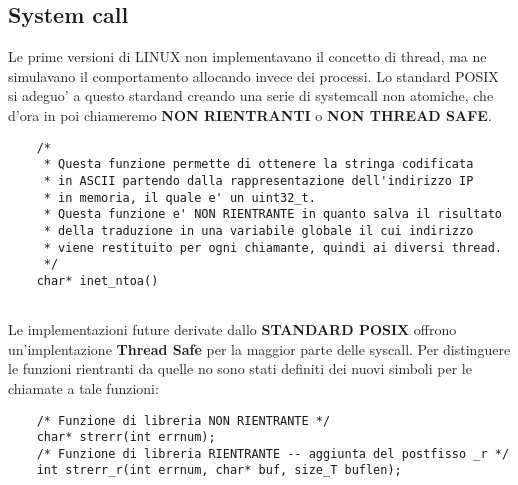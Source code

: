 \documentclass{article}
\begin{document}
    \subsection{System call}
    Le prime versioni di LINUX non implementavano il concetto
    di thread, ma ne simulavano il comportamento allocando 
    invece dei processi.
    Lo standard POSIX si adeguo' a questo stardand creando
    una serie di systemcall non atomiche, che d'ora in poi chiameremo
    \textbf{NON RIENTRANTI} o \textbf{NON THREAD SAFE}.
    \begin{verbatim}
    /*
     * Questa funzione permette di ottenere la stringa codificata
     * in ASCII partendo dalla rappresentazione dell'indirizzo IP
     * in memoria, il quale e' un uint32_t. 
     * Questa funzione e' NON RIENTRANTE in quanto salva il risultato
     * della traduzione in una variabile globale il cui indirizzo 
     * viene restituito per ogni chiamante, quindi ai diversi thread.
     */
    char* inet_ntoa()
                
    \end{verbatim}
    Le implementazioni future derivate dallo \textbf{STANDARD POSIX} 
    offrono un'implentazione \textbf{Thread Safe} per la maggior parte
    delle syscall.
    Per distinguere le funzioni rientranti da quelle no sono stati
    definiti dei nuovi simboli per le chiamate a tale funzioni:
    \begin{verbatim}
    /* Funzione di libreria NON RIENTRANTE */ 
    char* strerr(int errnum); 
    /* Funzione di libreria RIENTRANTE -- aggiunta del postfisso _r */
    int strerr_r(int errnum, char* buf, size_T buflen);
    \end{verbatim}
\newpage

\end{document}
